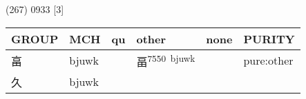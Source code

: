 \documentclass[14pt,a4paper]{scrartcl}
\begin{document}
(267) 0933 {[}3{]}

\begin{longtable}[c]{@{}llllll@{}}
\toprule
\begin{minipage}[b]{0.14\columnwidth}\raggedright\strut
GROUP
\strut\end{minipage} &
\begin{minipage}[b]{0.14\columnwidth}\raggedright\strut
MCH
\strut\end{minipage} &
\begin{minipage}[b]{0.14\columnwidth}\raggedright\strut
qu
\strut\end{minipage} &
\begin{minipage}[b]{0.14\columnwidth}\raggedright\strut
other
\strut\end{minipage} &
\begin{minipage}[b]{0.14\columnwidth}\raggedright\strut
none
\strut\end{minipage} &
\begin{minipage}[b]{0.14\columnwidth}\raggedright\strut
PURITY
\strut\end{minipage}\tabularnewline
\midrule
\endhead
\begin{minipage}[t]{0.14\columnwidth}\raggedright\strut
畗
\strut\end{minipage} &
\begin{minipage}[t]{0.14\columnwidth}\raggedright\strut
bjuwk
\strut\end{minipage} &
\begin{minipage}[t]{0.14\columnwidth}\raggedright\strut
\strut\end{minipage} &
\begin{minipage}[t]{0.14\columnwidth}\raggedright\strut
畐\textsuperscript{7550~bjuwk}
\strut\end{minipage} &
\begin{minipage}[t]{0.14\columnwidth}\raggedright\strut
\strut\end{minipage} &
\begin{minipage}[t]{0.14\columnwidth}\raggedright\strut
pure:other
\strut\end{minipage}\tabularnewline
\begin{minipage}[t]{0.14\columnwidth}\raggedright\strut
久
\strut\end{minipage} &
\begin{minipage}[t]{0.14\columnwidth}\raggedright\strut
bjuwk
\strut\end{minipage} &
\begin{minipage}[t]{0.14\columnwidth}\raggedright\strut

\end{minipage}
\end{longtable}
\end{document}
